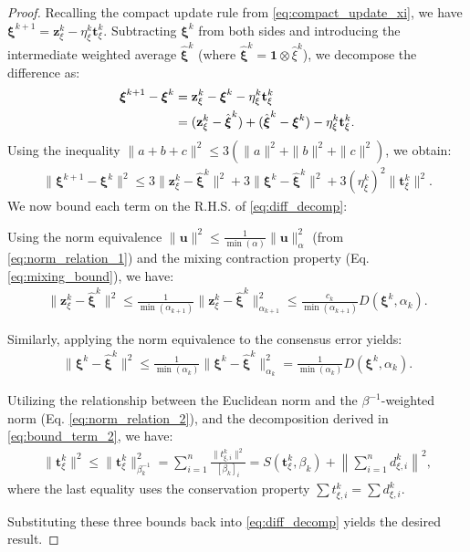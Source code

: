 \documentclass{article}
\theoremstyle{plain}
\theoremstyle{definition}
\theoremstyle{remark}
\begin{document}
\begin{proof}
    Recalling the compact update rule from \eqref{eq:compact_update_xi}, we have $\boldsymbol{\xi}^{k+1} = \mathbf{z}_{\xi}^k - \eta_{\xi}^k \mathbf{t}_{\xi}^k$. Subtracting $\boldsymbol{\xi}^k$ from both sides and introducing the intermediate weighted average $\hat{\boldsymbol{\xi}}^k$ (where $\hat{\boldsymbol{\xi}}^k = \mathbf{1} \otimes \hat{\xi}^k$), we decompose the difference as:
    \begin{align*}
        \boldsymbol{\xi}^{k+1} - \boldsymbol{\xi}^k
        &= \mathbf{z}_{\xi}^k - \boldsymbol{\xi}^k - \eta_{\xi}^k \mathbf{t}_{\xi}^k \notag \\
        &= (\mathbf{z}_{\xi}^k - \hat{\boldsymbol{\xi}}^k) + (\hat{\boldsymbol{\xi}}^k - \boldsymbol{\xi}^k) - \eta_{\xi}^k \mathbf{t}_{\xi}^k.
    \end{align*}
    Using the inequality $\|a+b+c\|^2 \leq 3(\|a\|^2 + \|b\|^2 + \|c\|^2)$, we obtain:
    \begin{align}\label{eq:diff_decomp}
        \|\boldsymbol{\xi}^{k+1} - \boldsymbol{\xi}^k\|^2
        \leq 3\|\mathbf{z}_{\xi}^k - \hat{\boldsymbol{\xi}}^k\|^2 + 3\|\boldsymbol{\xi}^k - \hat{\boldsymbol{\xi}}^k\|^2 + 3(\eta_{\xi}^k)^2 \|\mathbf{t}_{\xi}^k\|^2.
    \end{align}
    We now bound each term on the R.H.S. of \eqref{eq:diff_decomp}:
    
 Using the norm equivalence $\|\mathbf{u}\|^2 \leq \frac{1}{\min(\alpha)}\|\mathbf{u}\|_{\alpha}^2$ (from \eqref{eq:norm_relation_1}) and the mixing contraction property (Eq. \eqref{eq:mixing_bound}), we have:
    \begin{align*}
        \|\mathbf{z}_{\xi}^k - \hat{\boldsymbol{\xi}}^k\|^2
        \leq \frac{1}{\min(\alpha_{k+1})} \|\mathbf{z}_{\xi}^k - \hat{\boldsymbol{\xi}}^k\|_{\alpha_{k+1}}^2 \leq \frac{c_k}{\min(\alpha_{k+1})} D(\boldsymbol{\xi}^k, \alpha_k).
    \end{align*}

 Similarly, applying the norm equivalence to the consensus error yields:
    \begin{align*}
        \|\boldsymbol{\xi}^k - \hat{\boldsymbol{\xi}}^k\|^2 \leq \frac{1}{\min(\alpha_k)} \|\boldsymbol{\xi}^k - \hat{\boldsymbol{\xi}}^k\|_{\alpha_k}^2 = \frac{1}{\min(\alpha_k)} D(\boldsymbol{\xi}^k, \alpha_k).
    \end{align*}

Utilizing the relationship between the Euclidean norm and the $\beta^{-1}$-weighted norm (Eq. \eqref{eq:norm_relation_2}), and the decomposition derived in \eqref{eq:bound_term_2}, we have:
    \begin{align*}
        \|\mathbf{t}_{\xi}^k\|^2
        \leq \|\mathbf{t}_{\xi}^k\|_{\beta_k^{-1}}^2
        = \sum_{i=1}^n \frac{\|t_{\xi,i}^k\|^2}{[\beta_k]_i}
        = S(\mathbf{t}_{\xi}^k, \beta_k) + \left\| \sum_{i=1}^n d_{\xi,i}^k \right\|^2,
    \end{align*}
    where the last equality uses the conservation property $\sum t_{\xi,i}^k = \sum d_{\xi,i}^k$.

    Substituting these three bounds back into \eqref{eq:diff_decomp} yields the desired result.
\end{proof}
\end{document}

